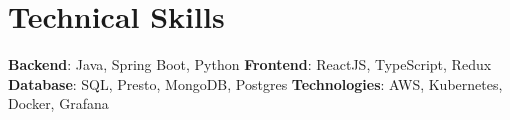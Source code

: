 \section{\bf Technical Skills}
    \begin{itemize}[leftmargin=0.15in, label={}]
	\small{\item{
		\textbf{Backend}{: Java, Spring Boot, Python}
		  \hfill \textbf{Frontend}{: ReactJS, TypeScript, Redux} \\
		\textbf{Database}{: SQL, Presto, MongoDB, Postgres}
		\hfill \textbf{Technologies}{: AWS, Kubernetes, Docker, Grafana}
	}}
    \end{itemize}
